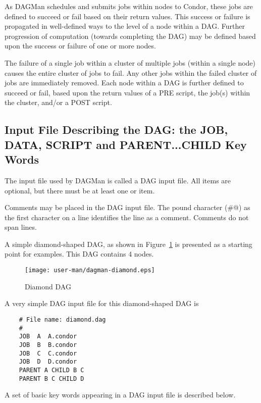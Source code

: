As DAGMan schedules and submits jobs within nodes to Condor,
these jobs are defined to succeed or fail based on their
return values.
This success or failure is propagated in well-defined ways to the level of
a node within a DAG.
Further progression of computation
(towards completing the DAG)
may be defined based upon the success or failure of one or more nodes.

The failure of a single job within a cluster
of multiple jobs
(within a single node)
causes the entire cluster of jobs to fail.
Any other jobs within the failed cluster of jobs are
immediately removed.
Each node within a DAG is further defined to succeed or fail,
based upon the return values of a PRE script, the job(s)
within the cluster, and/or a POST script.

\subsection{Input File Describing the DAG: the JOB, DATA, SCRIPT and PARENT...CHILD Key Words}

The input file used by DAGMan is called a DAG input file.
All items are optional, but there must be at least one 
or  item.

Comments may be placed in the DAG input file.
The pound character (\verb@#@) as the first character on a
line identifies the line as a comment.
Comments do not span lines.

A simple diamond-shaped DAG, as shown in
Figure~\ref{fig:dagman-diamond}
is presented as a starting point for examples.
This DAG contains 4 nodes.

\begin{figure}[hbt]
\centering
\texttt{[image: user-man/dagman-diamond.eps]}
\caption{\label{fig:dagman-diamond}Diamond DAG}
\end{figure}


A very simple DAG input file for this diamond-shaped DAG is

\footnotesize
\begin{verbatim}
    # File name: diamond.dag
    #
    JOB  A  A.condor 
    JOB  B  B.condor 
    JOB  C  C.condor	
    JOB  D  D.condor
    PARENT A CHILD B C
    PARENT B C CHILD D
\end{verbatim}
\normalsize

A set of basic key words appearing in a DAG input file is described below.

